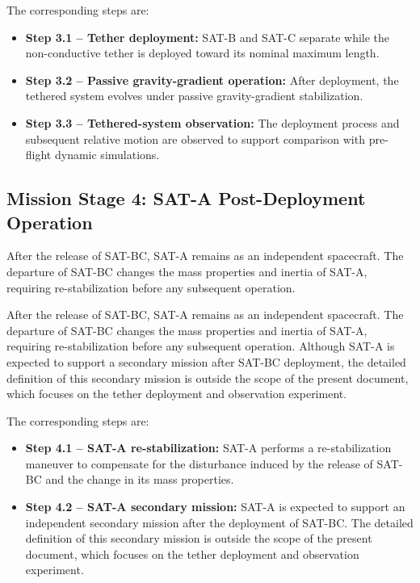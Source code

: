 The corresponding steps are:

\begin{itemize}
    \item \textbf{Step 3.1 -- Tether deployment:} SAT-B and SAT-C separate while the non-conductive tether is deployed toward its nominal maximum length.

    \item \textbf{Step 3.2 -- Passive gravity-gradient operation:} After deployment, the tethered system evolves under passive gravity-gradient stabilization.

    \item \textbf{Step 3.3 -- Tethered-system observation:} The deployment process and subsequent relative motion are observed to support comparison with pre-flight dynamic simulations.
\end{itemize}

\subsection{Mission Stage 4: SAT-A Post-Deployment Operation}
\label{sub:conops_stage4_sata_post_deployment}

After the release of SAT-BC, SAT-A remains as an independent spacecraft. The departure of SAT-BC changes the mass properties and inertia of SAT-A, requiring re-stabilization before any subsequent operation.

After the release of SAT-BC, SAT-A remains as an independent spacecraft. The departure of SAT-BC changes the mass properties and inertia of SAT-A, requiring re-stabilization before any subsequent operation. Although SAT-A is expected to support a secondary mission after SAT-BC deployment, the detailed definition of this secondary mission is outside the scope of the present document, which focuses on the tether deployment and observation experiment.

The corresponding steps are:

\begin{itemize}
    \item \textbf{Step 4.1 -- SAT-A re-stabilization:} SAT-A performs a re-stabilization maneuver to compensate for the disturbance induced by the release of SAT-BC and the change in its mass properties.

    \item \textbf{Step 4.2 -- SAT-A secondary mission:} SAT-A is expected to support an independent secondary mission after the deployment of SAT-BC. The detailed definition of this secondary mission is outside the scope of the present document, which focuses on the tether deployment and observation experiment.
\end{itemize}

